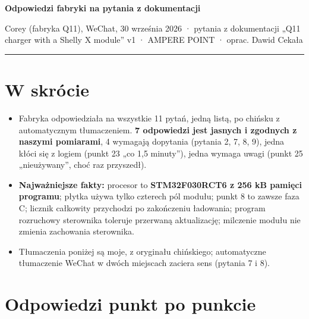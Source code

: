 \documentclass[11pt,a4paper]{article}
\begin{document}
{\LARGE\bfseries Odpowiedzi fabryki na pytania z dokumentacji\par}
{\large Corey (fabryka Q11), WeChat, 30 września 2026 · pytania z dokumentacji „Q11 charger with a Shelly X module” v1 · AMPERE POINT · oprac. Dawid Cekała\par}
\vspace{4pt}\textcolor{apteal}{\rule{\textwidth}{1.2pt}}

\section*{W skrócie}

\begin{itemize}
\item Fabryka odpowiedziała na wszystkie 11 pytań, jedną listą, po chińsku z automatycznym tłumaczeniem. \textbf{7 odpowiedzi jest jasnych i zgodnych z naszymi pomiarami}, 4 wymagają dopytania (pytania 2, 7, 8, 9), jedna kłóci się z logiem (punkt 23 „co 1,5 minuty”), jedna wymaga uwagi (punkt 25 „nieużywany”, choć raz przyszedł).
\item \textbf{Najważniejsze fakty:} procesor to \textbf{STM32F030RCT6 z 256 kB pamięci programu}; płytka używa tylko czterech pól modułu; punkt 8 to zawsze faza C; licznik całkowity przychodzi po zakończeniu ładowania; program rozruchowy sterownika toleruje przerwaną aktualizację; milczenie modułu nie zmienia zachowania sterownika.
\item Tłumaczenia poniżej są moje, z oryginału chińskiego; automatyczne tłumaczenie WeChat w dwóch miejscach zaciera sens (pytania 7 i 8).
\end{itemize}

\section{Odpowiedzi punkt po punkcie}
\end{document}
